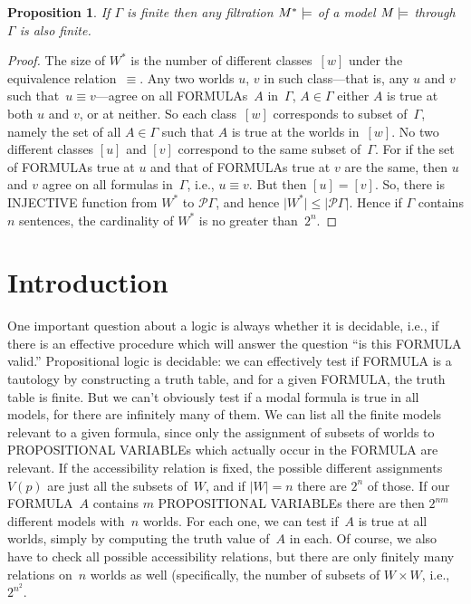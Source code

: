 \documentclass[10pt,a4paper]{article}
\newcommand*{\olup}[1]{\MakeUppercase{#1}}
\theoremstyle{plain}
\newtheorem{prop}[thm]{Proposition}
\theoremstyle{definition}
\theoremstyle{remark}
\newcommand*{\olfileid}[3]{}
\newcommand*{\olsection}[1]{\section*{#1}}
\newcommand*{\ollabel}[1]{\label{#1}}
\providecommand{\mModel}[2]{\ensuremath{#1 \models #2}}
\providecommand{\card}[1]{\lvert #1 \rvert}
\providecommand{\Pow}{\mathcal{P}}
\begin{document}
\begin{prop}\ollabel{prop:filt-are-finite}
  If $\Gamma$ is finite then any filtration $\mModel{M^*}$ of a model
  $\mModel{M}$ through $\Gamma$ is also finite.
\end{prop}

\begin{proof}
  The size of $W^*$ is the number of different classes~$[w]$ under the
  equivalence relation~$\equiv$. Any two worlds $u$, $v$ in such
  class---that is, any $u$ and $v$ such that~$u \equiv v$---agree on
  all \olup{formula}s~$A$ in~$\Gamma$, $A \in \Gamma$ either $A$ is
  true at both $u$ and $v$, or at neither. So each class~$[w]$
  corresponds to subset of~$\Gamma$, namely the set of all $A \in
  \Gamma$ such that $A$ is true at the worlds in~$[w]$. No two
  different classes $[u]$ and $[v]$ correspond to the same subset
  of~$\Gamma$. For if the set of \olup{formula}s true at $u$ and that of
  \olup{formula}s true at $v$ are the same, then $u$ and $v$ agree on all
  formulas in~$\Gamma$, i.e., $u \equiv v$. But then $[u] = [v]$.  So,
  there is \olup{injective} function from $W^*$ to $\Pow{\Gamma}$, and
  hence $\card{W^*} \le \card{\Pow{\Gamma}}$.  Hence if $\Gamma$
  contains $n$ sentences, the cardinality of $W^*$ is no greater
  than~$2^n$.
\end{proof}







\olfileid{nml}{fil}{int}

\olsection{Introduction}

One important question about a logic is always whether it is
decidable, i.e., if there is an effective procedure which will answer
the question ``is this \olup{formula} valid.'' Propositional logic is
decidable: we can effectively test if \olup{formula} is a tautology by
constructing a truth table, and for a given \olup{formula}, the truth
table is finite.  But we can't obviously test if a modal formula is
true in all models, for there are infinitely many of them.  We can
list all the finite models relevant to a given formula, since only the
assignment of subsets of worlds to \olup{propositional variable}s which
actually occur in the \olup{formula} are relevant. If the accessibility
relation is fixed, the possible different assignments $V(p)$ are just
all the subsets of~$W$, and if $\card{W} = n$ there are $2^n$ of
those. If our \olup{formula}~$A$ contains $m$ \olup{propositional
  variable}s there are then $2^{nm}$ different models with~$n$
worlds. For each one, we can test if~$A$ is true at all worlds,
simply by computing the truth value of~$A$ in each. Of course, we
also have to check all possible accessibility relations, but there are
only finitely many relations on~$n$ worlds as well (specifically, the
number of subsets of $W \times W$, i.e., $2^{n^2}$.
\end{document}

